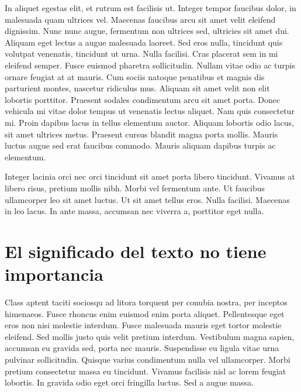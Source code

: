 \documentclass[11pt,a4paper]{report}
\begin{document}
In aliquet egestas elit, et rutrum est facilisis ut. Integer tempor faucibus dolor, in malesuada quam ultrices vel. Maecenas faucibus arcu sit amet velit eleifend dignissim. Nunc nunc augue, fermentum non ultrices sed, ultricies sit amet dui. Aliquam eget lectus a augue malesuada laoreet. Sed eros nulla, tincidunt quis volutpat venenatis, tincidunt ut urna. Nulla facilisi. Cras placerat sem in mi eleifend semper. Fusce euismod pharetra sollicitudin. Nullam vitae odio ac turpis ornare feugiat at at mauris. Cum sociis natoque penatibus et magnis dis parturient montes, nascetur ridiculus mus. Aliquam sit amet velit non elit lobortis porttitor. Praesent sodales condimentum arcu sit amet porta. Donec vehicula mi vitae dolor tempus ut venenatis lectus aliquet. Nam quis consectetur mi. Proin dapibus lacus in tellus elementum auctor. Aliquam lobortis odio lacus, sit amet ultrices metus. Praesent cursus blandit magna porta mollis. Mauris luctus augue sed erat faucibus commodo. Mauris aliquam dapibus turpis ac elementum.

Integer lacinia orci nec orci tincidunt sit amet porta libero tincidunt. Vivamus at libero risus, pretium mollis nibh. Morbi vel fermentum ante. Ut faucibus ullamcorper leo sit amet luctus. Ut sit amet tellus eros. Nulla facilisi. Maecenas in leo lacus. In ante massa, accumsan nec viverra a, porttitor eget nulla. 








\section{El significado del texto no tiene importancia}




Class aptent taciti sociosqu ad litora torquent per conubia nostra, per inceptos himenaeos. Fusce rhoncus enim euismod enim porta aliquet. Pellentesque eget eros non nisi molestie interdum. Fusce malesuada mauris eget tortor molestie eleifend. Sed mollis justo quis velit pretium interdum. Vestibulum magna sapien, accumsan eu gravida sed, porta nec mauris. Suspendisse eu ligula vitae urna pulvinar sollicitudin. Quisque varius condimentum nulla vel ullamcorper. Morbi pretium consectetur massa eu tincidunt. Vivamus facilisis nisl ac lorem feugiat lobortis. In gravida odio eget orci fringilla luctus. Sed a augue massa.
\end{document}

